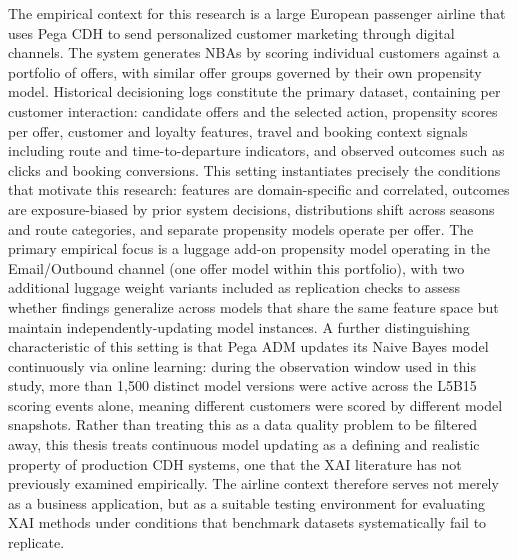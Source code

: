 \documentclass[oneside]{memoir} %
\begin{document}
The empirical context for this research is a large European passenger airline that uses Pega CDH to send personalized customer marketing through digital channels. The system generates NBAs by scoring individual customers against a portfolio of offers, with similar offer groups governed by their own propensity model. Historical decisioning logs constitute the primary dataset, containing per customer interaction: candidate offers and the selected action, propensity scores per offer, customer and loyalty features, travel and booking context signals including route and time-to-departure indicators, and observed outcomes such as clicks and booking conversions. This setting instantiates precisely the conditions that motivate this research: features are domain-specific and correlated, outcomes are exposure-biased by prior system decisions, distributions shift across seasons and route categories, and separate propensity models operate per offer. The primary empirical focus is a luggage add-on propensity model operating in the Email/Outbound channel (one offer model within this portfolio), with two additional luggage weight variants included as replication checks to assess whether findings generalize across models that share the same feature space but maintain independently-updating model instances. A further distinguishing characteristic of this setting is that Pega ADM updates its Naive Bayes model continuously via online learning: during the observation window used in this study, more than 1{,}500 distinct model versions were active across the L5B15 scoring events alone, meaning different customers were scored by different model snapshots. Rather than treating this as a data quality problem to be filtered away, this thesis treats continuous model updating as a defining and realistic property of production CDH systems, one that the XAI literature has not previously examined empirically. The airline context therefore serves not merely as a business application, but as a suitable testing environment for evaluating XAI methods under conditions that benchmark datasets systematically fail to replicate.
\end{document}
